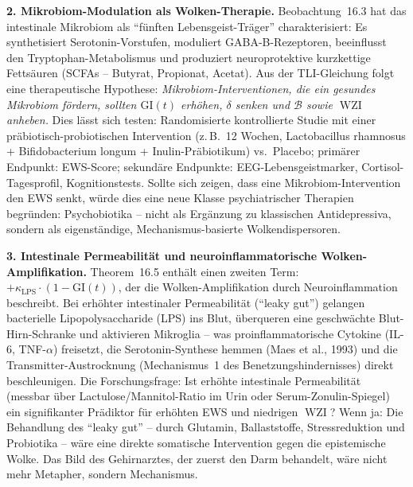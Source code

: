 ﻿\documentclass[12pt,a4paper]{report}
\theoremstyle{plain}
\theoremstyle{definition}
\theoremstyle{remark}
\DeclareMathOperator{\WZI}{WZI}
\begin{document}
	\textbf{2. Mikrobiom-Modulation als Wolken-Therapie.}
	Beobachtung~16.3 hat das intestinale Mikrobiom als ``fünften
	Lebensgeist-Träger'' charakterisiert: Es synthetisiert
	Sero\-tonin-Vorstufen, moduliert GABA-B-Rezeptoren, beeinflusst
	den Tryptophan-Metabolis\-mus und produziert neuroprotektive
	kurzkettige Fettsäuren (SCFAs -- Butyrat, Propionat, Acetat).
	Aus der TLI-Gleichung folgt eine therapeutische Hypothese:
	\emph{Mikrobiom-Interventionen, die ein gesundes Mikrobiom
	fördern, sollten $\mathrm{GI}(t)$ erhöhen, $\delta$ senken
	und $\mathcal{B}$ sowie $\WZI$ anheben.}
	Dies lässt sich testen: Randomisierte kontrollierte Studie
	mit einer präbiotisch-probiotischen Intervention (z.\,B.\ 12 Wochen,
	Lactobacillus rhamnosus + Bifidobacterium longum + Inulin-Präbiotikum)
	vs.\ Placebo; primärer Endpunkt: EWS-Score; sekundäre Endpunkte:
	EEG-Lebensgeistmarker, Cortisol-Tagesprofil, Kognitionstests.
	Sollte sich zeigen, dass eine Mikrobiom-Intervention den EWS senkt,
	würde dies eine neue Klasse psychiatrischer Therapien begründen:
	Psychobiotika -- nicht als Ergänzung zu klassischen Antidepressiva,
	sondern als eigenständige, Mechanismus-basierte Wolkendispersoren.

	\textbf{3. Intestinale Permeabilität und neuroinflammatorische
		Wolken-Amplifikation.}
	Theorem~16.5 enthält einen zweiten Term:
	$+\kappa_{\mathrm{LPS}} \cdot (1 - \mathrm{GI}(t))$,
	der die Wolken-Amplifikation durch Neuroinflammation beschreibt.
	Bei erhöhter intestinaler Permeabilität (``leaky gut'') gelangen
	bacterielle Lipopolysaccharide (LPS) ins Blut, überqueren eine
	geschwächte Blut-Hirn-Schranke und aktivieren Mikroglia --
	was proinflammatorische Cytokine (IL-6, TNF-$\alpha$) freisetzt,
	die Serotonin-Synthese hemmen (Maes et al., 1993) und
	die Transmitter-Austrocknung (Mechanismus~1 des Benetzungs\-hindernisses)
	direkt beschleunigen.
	Die Forschungsfrage: Ist erhöhte intestinale Permeabilität
	(messbar über Lactulose/Mannitol-Ratio im Urin oder
	Serum-Zonulin-Spiegel) ein signifikanter Prädiktor für
	erhöhten EWS und niedrigen $\WZI$?
	Wenn ja: Die Behandlung des ``leaky gut'' -- durch Glutamin,
	Ballaststoffe, Stressreduktion und Probiotika -- wäre eine
	direkte somatische Intervention gegen die epistemische Wolke.
	Das Bild des Gehirnarztes, der zuerst den Darm behandelt,
	wäre nicht mehr Metapher, sondern Mechanismus.
\end{document}
